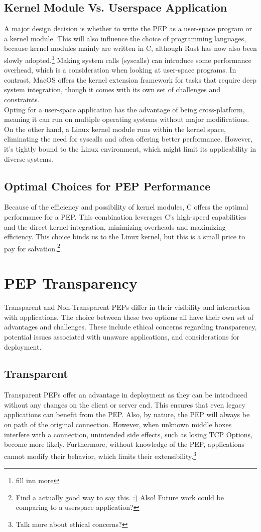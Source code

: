 \documentclass[a4paper,english, 11pt]{report}
\begin{document}
\subsection{Kernel Module Vs. Userspace Application}
A major design decision is whether to write the PEP as a user-space program or a kernel module. This will also influence the choice of programming languages, because kernel modules mainly are written in C, although Rust has now also been slowly adopted.\footnote{fill inn more} Making system calls (syscalls) can introduce some performance overhead, which is a consideration when looking at user-space programs. In contrast, MacOS offers the kernel extension framework for tasks that require deep system integration, though it comes with its own set of challenges and constraints.\\

Opting for a user-space application has the advantage of being cross-platform, meaning it can run on multiple operating systems without major modifications. On the other hand, a Linux kernel module runs within the kernel space, eliminating the need for syscalls and often offering better performance. However, it's tightly bound to the Linux environment, which might limit its applicability in diverse systems.

\subsection{Optimal Choices for PEP Performance}
Because of the efficiency and possibility of kernel modules, C offers the optimal performance for a PEP. This combination leverages C's high-speed capabilities and the direct kernel integration, minimizing overheads and maximizing efficiency. This choice binds us to the Linux kernel, but this is a small price to pay for salvation.\footnote{Find a actually good way to say this. :) Also! Future work could be comparing to a userspace application? }

\section{PEP Transparency}
Transparent and Non-Transparent PEPs differ in their visibility and interaction with applications. The choice between these two options all have their own set of advantages and challenges. These include ethical concerns regarding transparency, potential issues associated with unaware applications, and considerations for deployment.

\subsection{Transparent}
Transparent PEPs offer an advantage in deployment as they can be introduced without any changes on the client or server end. This ensures that even legacy applications can benefit from the PEP. Also, by nature, the PEP will always be on path of the original connection. However, when unknown middle boxes interfere with a connection, unintended side effects, such as losing TCP Options, become more likely. Furthermore, without knowledge of the PEP, applications cannot modify their behavior, which limits their extensibility.\footnote{Talk more about ethical concerns?}
\end{document}
